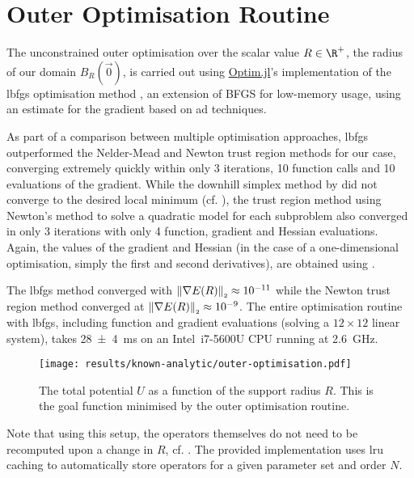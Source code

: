 \section{Outer Optimisation Routine}
The unconstrained outer optimisation over the scalar value $R \in \R^+$, the radius of our domain $B_R(\vec{0})$, is carried out using \href{https://github.com/JuliaNLSolvers/Optim.jl}{Optim.jl}'s implementation \parencite{2023-optim-jl} of the \gls{lbfgs} optimisation method \parencite{1989-lbfgs}, an extension of BFGS for low-memory usage, using an estimate for the gradient based on \gls{ad} techniques.

As part of a comparison between multiple optimisation approaches, \gls{lbfgs} outperformed the Nelder-Mead and Newton trust region methods for our case, converging extremely quickly within only 3 iterations, 10 function calls and 10 evaluations of the gradient.
While the downhill simplex method by \citeauthor{1965-nelder-mead} did not converge to the desired local minimum (cf. ), the trust region method using Newton's method to solve a quadratic model for each subproblem \parencite{1982-trust-region} also converged in only 3 iterations with only 4 function, gradient and Hessian evaluations.
Again, the values of the gradient and Hessian (in the case of a one-dimensional optimisation, simply the first and second derivatives), are obtained using .

The \gls{lbfgs} method converged with $\left\lVert\nabla E(R)\right\rVert_{\scriptscriptstyle 2} \approx 10^{-11}$ while the Newton trust region method converged at $\left\lVert\nabla E(R)\right\rVert_{\scriptscriptstyle 2} \approx 10^{-9}$.
The entire optimisation routine with \gls{lbfgs}, including function and gradient evaluations (solving a $12 \times 12$ linear system), takes \SI{28 \pm 4}{\milli\second} on an Intel\textregistered \, i7-5600U CPU running at \SI{2.6}{\giga\hertz}.

\begin{figure}[H]
  \centering
  \texttt{[image: results/known-analytic/outer-optimisation.pdf]}
  \caption[Outer Optimisation Routine]{The total potential $U$ as a function of the support radius $R$. This is the goal function minimised by the outer optimisation routine.}
  \label{fig:outer-optimisation}
\end{figure}

Note that using this setup, the operators themselves do not need to be recomputed upon a change in $R$, cf. .
The provided implementation uses \gls{lru} caching to automatically store operators for a given parameter set and order $N$.

